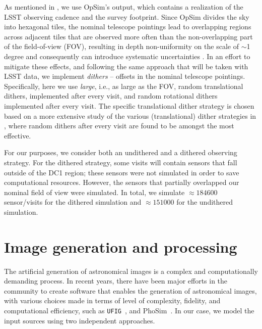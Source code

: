\documentclass[\docopts]{\docclass}
\begin{document}
As mentioned in , we use OpSim's output, which contains a realization of the LSST observing cadence and the survey footprint. Since OpSim divides the sky into hexagonal tiles, the nominal telescope pointings lead to overlapping regions across adjacent tiles that are observed more often than the non-overlapping part of the field-of-view (FOV), resulting in depth non-uniformity on the scale of $\sim$1 degree and consequently can introduce systematic uncertainties \citep{2016ApJ...829...50A}. In an effort to mitigate these effects, and following the same approach that will be taken with LSST data, we implement \textit{dithers} -- offsets in the nominal telescope pointings. Specifically, here we use \textit{large}, i.e., as large as the FOV, random translational dithers, implemented after every visit, and random rotational dithers implemented after every visit. The specific translational dither strategy is chosen based on a more extensive study of the various (translational) dither strategies in \citet{2016ApJ...829...50A}, where random dithers after every visit are found to be amongst the most effective.

For our purposes, we consider both an undithered and a dithered observing strategy. For the dithered strategy, some visits will contain sensors that fall outside of the DC1 region; these sensors were not simulated in order to save computational resources. However, the sensors that partially overlapped our nominal field of view were simulated. In total, we simulate $\approx 184600$ sensor/visits for the dithered simulation and $\approx 151000$ for the undithered simulation.




\section{Image generation and processing}
\label{sec:image_generation_pipeline}

The artificial generation of astronomical images is a complex and computationally demanding process. In recent
years, there have been major efforts in the community to create software that enables the generation of astronomical images, with various choices made in terms of level of complexity, fidelity, and computational efficiency, such as \texttt{UFIG}~\citep{2016ApJ...817...25B}, and PhoSim~\citep{2015ApJS..218...14P}. In our case, we model the input sources using
two independent approaches. 
\end{document}
